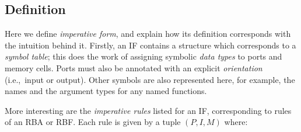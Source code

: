 \subsection{Definition}
\label{sec:imperative_form_definition}
Here we define \textit{imperative form}, and explain how its definition corresponds with the intuition behind it. Firstly, an IF contains a structure which corresponds to a \textit{symbol table}; this does the work of assigning symbolic \textit{data types} to ports and memory cells. Ports must also be annotated with an explicit \textit{orientation} (i.e.,\ input or output). Other symbols are also represented here, for example, the names and the argument types for any named functions.

More interesting are the \textit{imperative rules} listed for an IF, corresponding to rules of an RBA or RBF. Each rule is given by a tuple $(P,I,M)$ where:
